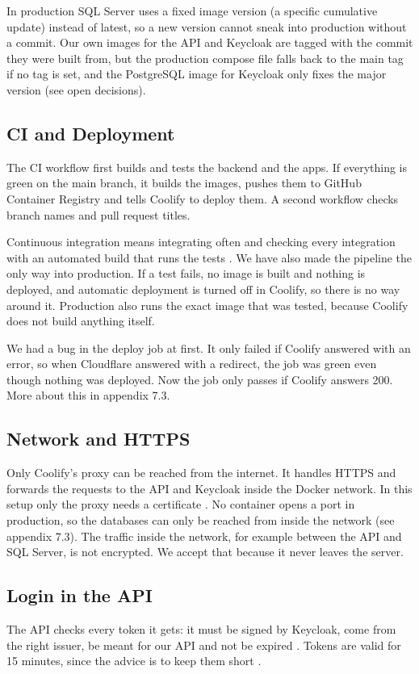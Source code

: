 \documentclass[a4paper,11pt]{article}
\begin{document}
In production SQL Server uses a fixed image version (a specific cumulative update) instead of latest, so a new version cannot sneak into production without a commit. Our own images for the API and Keycloak are tagged with the commit they were built from, but the production compose file falls back to the main tag if no tag is set, and the PostgreSQL image for Keycloak only fixes the major version (see open decisions).

\subsection{CI and Deployment}
The CI workflow first builds and tests the backend and the apps. If everything is green on the main branch, it builds the images, pushes them to GitHub Container Registry and tells Coolify to deploy them. A second workflow checks branch names and pull request titles.

Continuous integration means integrating often and checking every integration with an automated build that runs the tests \cite{fowler-continuous-integration}. We have also made the pipeline the only way into production. If a test fails, no image is built and nothing is deployed, and automatic deployment is turned off in Coolify, so there is no way around it. Production also runs the exact image that was tested, because Coolify does not build anything itself.

We had a bug in the deploy job at first. It only failed if Coolify answered with an error, so when Cloudflare answered with a redirect, the job was green even though nothing was deployed. Now the job only passes if Coolify answers 200. More about this in appendix 7.3.

\subsection{Network and HTTPS}
Only Coolify's proxy can be reached from the internet. It handles HTTPS and forwards the requests to the API and Keycloak inside the Docker network. In this setup only the proxy needs a certificate \cite{microsoft-kestrel-reverse-proxy}. No container opens a port in production, so the databases can only be reached from inside the network (see appendix 7.3). The traffic inside the network, for example between the API and SQL Server, is not encrypted. We accept that because it never leaves the server.

\subsection{Login in the API}
The API checks every token it gets: it must be signed by Keycloak, come from the right issuer, be meant for our API and not be expired \cite[sec.~9.2.5]{desanctis-web-apis-aspnet-core}\cite[secs.~4.1.1, 4.1.3, 4.1.4 and 7.2]{ietf-rfc7519-jwt}. Tokens are valid for 15 minutes, since the advice is to keep them short \cite[sec.~9.1.2]{desanctis-web-apis-aspnet-core}.
\end{document}
